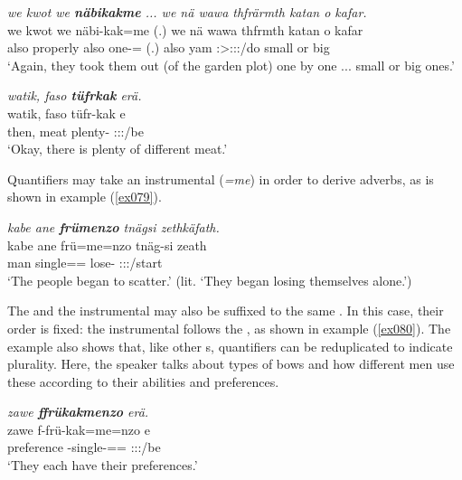 \begin{exe}
	\ex \emph{we kwot we \textbf{näbikakme} ... we nä wawa thfrärmth katan o kafar.}\\
	\gll we kwot we näbi-kak=me (.) we nä wawa thfrmth katan o kafar\\
	also properly also one-\Distr={\Ins} (.) also {\Indf} yam \Stpl:\Sbj>\Stpl:\Obj:\Pst:\Dur/do small or big\\
	\trans `Again, they took them out (of the garden plot) one by one ... small or big ones.' 
	\label{ex742}
\end{exe}
\begin{exe}
	\ex \emph{watik, faso \textbf{tüfrkak} erä.}\\
	\gll watik, faso tüfr-kak e\\
	then, meat plenty-{\Distr} \Stpl:\Sbj:\Nonpast:\Ipfv/be\\
	\trans `Okay, there is plenty of different meat.' 
	\label{ex078}
\end{exe}

Quantifiers may take an instrumental  (\emph{=me}) in order to derive adverbs, as is shown in example (\ref{ex079}).

\begin{exe}
	\ex \emph{kabe ane \textbf{frümenzo} tnägsi zethkäfath.}\\
	\gll kabe ane frü=me=nzo tnäg-si zeath\\
	man {\Dem} single=\Ins={\Only} lose-{\Nmlz} \Stpl{}:\Sbj:\Pst:\Ipfv/start\\
	\trans `The people began to scatter.' (lit. `They began losing themselves alone.')\\ 
	\label{ex079}
\end{exe}

The  and the instrumental may also be suffixed to the same . In this case, their order is fixed: the instrumental follows the , as shown in example (\ref{ex080}). The example also shows that, like other s, quantifiers can be reduplicated to indicate plurality. Here, the speaker talks about types of bows and how different men use these according to their abilities and preferences.

\begin{exe}
	\ex \emph{zawe \textbf{ffrükakmenzo} erä.}\\
	\gll zawe f-frü-kak=me=nzo e\\
	preference \Redup-single-\Distr=\Ins={\Only} \Stpl:\Sbj:\Nonpast:\Ipfv/be\\
	\trans `They each have their preferences.' 
	\label{ex080}
\end{exe}

